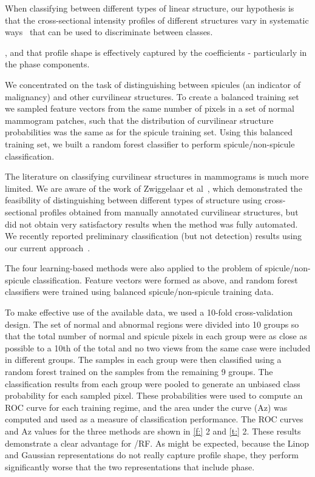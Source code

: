 When classifying between different types of linear structure, our hypothesis is that the cross-sectional intensity profiles of different structures vary in systematic ways~\cite{Zwiggelaar_etal_TMI04} that can be used to discriminate between classes.

, and that profile shape is effectively captured by the \dtcwt{} coefficients - particularly in the phase components. 

We concentrated on the task of distinguishing between spicules (an indicator of malignancy) and other curvilinear structures.  To create a balanced training set we sampled feature vectors from the same number of pixels in a set of normal mammogram patches, such that the distribution of curvilinear structure probabilities was the same as for the spicule training set. Using this balanced training set, we built a random forest classifier to perform spicule/non-spicule classification.

The literature on classifying curvilinear structures in mammograms is much more limited. We are aware of the work of Zwiggelaar et al~\cite{Zwiggelaar_etal_TMI04}, which demonstrated the feasibility of distinguishing between different types of structure using cross-sectional profiles obtained from manually annotated curvilinear structures, but did not obtain very satisfactory results when the method was fully automated.  We recently reported preliminary classification (but not detection) results using our current approach~\cite{Chen_etal_IWDM10}.


The four learning-based methods were also applied to the problem of spicule/non-spicule classification. Feature vectors were formed as above, and random forest classifiers were trained using balanced spicule/non-spicule training data.

To make effective use of the available data, we used a 10-fold cross-validation design. The set of normal and abnormal regions were divided into 10 groups so that the total number of normal and spicule pixels in each group were as close as possible to a 10th of the total and no two views from the same case were included in different groups. The samples in each group were then classified using a random forest trained on the samples from the remaining 9 groups. The classification results from each group were pooled to generate an unbiased class probability for each sampled pixel. These probabilities were used to compute an ROC curve for each training regime, and the area under the curve (Az) was computed and used as a measure of classification performance. The ROC curves and Az values for the three methods are shown in \ref{f:} 2 and \ref{t:} 2. These results demonstrate a clear advantage for \dtcwt{}/RF. As might be expected, because the Linop and Gaussian representations do not really capture profile shape, they perform significantly worse that the two representations that include phase.


